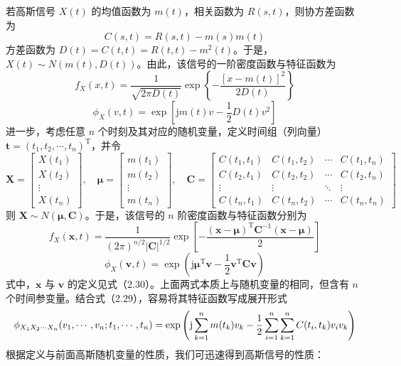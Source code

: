 \documentclass[11pt,openany,UTF8]{ctexbook}
\newcommand{\ju}{\mathrm{j}}                       %
\newcommand{\bX}{\bm{X}}
\newcommand{\bx}{\bm{x}}
\begin{document}
若高斯信号 $X(t)$ 的均值函数为 $m(t)$\nobreak，相关函数为 $R(s,t)$\nobreak，则协方差函数为
\[
C(s,t)=R(s,t)-m(s)m(t)
\]
方差函数为 $D(t)=C(t,t)=R(t,t)-m^2(t)$\nobreak。于是\nobreak，$X(t)\sim N(m(t),D(t))$\nobreak。由此\nobreak，该信号的一阶密度函数与特征函数为
\begin{equation}
f_X(x,t)=\frac{1}{\sqrt{2\pi D(t)}}\exp\left\{-\frac{[x-m(t)]^2}{2D(t)}\right\}
\label{eq:2.38}
\end{equation}
\begin{equation}
\phi_X(v,t)=\exp\left[\ju m(t)v-\frac{1}{2}D(t)v^2\right]
\label{eq:2.39}
\end{equation}
进一步\nobreak，考虑任意 $n$ 个时刻及其对应的随机变量\nobreak，定义时间组（列向量\nobreak）$\bm{t}=(t_1,t_2,\cdots,t_n)^{\mathrm{T}}$\nobreak，并令
\[
\bX=\begin{bmatrix}
X(t_1)\\ X(t_2)\\ \vdots\\ X(t_n)
\end{bmatrix},\quad
\bm{\mu}=\begin{bmatrix}
m(t_1)\\ m(t_2)\\ \vdots\\ m(t_n)
\end{bmatrix},\quad
\bm{C}=\begin{bmatrix}
C(t_1,t_1) & C(t_1,t_2) & \cdots & C(t_1,t_n)\\
C(t_2,t_1) & C(t_2,t_2) & \cdots & C(t_2,t_n)\\
\vdots & \vdots & \ddots & \vdots\\
C(t_n,t_1) & C(t_n,t_2) & \cdots & C(t_n,t_n)
\end{bmatrix}
\]
则 $\bX\sim N(\bm{\mu},\bm{C})$\nobreak。于是\nobreak，该信号的 $n$ 阶密度函数与特征函数分别为
\begin{equation}
f_X(\bx,t)=\frac{1}{(2\pi)^{n/2}\lvert\bm{C}\rvert^{1/2}}\exp\left[-\frac{(\bx-\bm{\mu})^{\mathrm{T}}\bm{C}^{-1}(\bx-\bm{\mu})}{2}\right]
\label{eq:2.40}
\end{equation}
\begin{equation}
\phi_X(\bm{v},t)=\exp\left(\ju\bm{\mu}^{\mathrm{T}}\bm{v}-\frac{1}{2}\bm{v}^{\mathrm{T}}\bm{C}\bm{v}\right)
\label{eq:2.41}
\end{equation}
式中\nobreak，$\bx$ 与 $\bm{v}$ 的定义见式（2.30\nobreak）\nobreak。上面两式本质上与随机变量的相同\nobreak，但含有 $n$ 个时间参变量\nobreak。结合式（2.29\nobreak）\nobreak，容易将其特征函数写成展开形式
\begin{equation}
\resizebox{\linewidth}{!}{$\displaystyle
\phi_{X_1X_2\cdots X_n}(v_1,\cdots,v_n;t_1,\cdots,t_n)=\exp\left(\ju\sum_{k=1}^{n}m(t_k)v_k-\frac{1}{2}\sum_{i=1}^{n}\sum_{k=1}^{n}C(t_i,t_k)v_iv_k\right)$}
\label{eq:2.42}
\end{equation}
根据定义与前面高斯随机变量的性质\nobreak，我们可迅速得到高斯信号的性质\nobreak：
\end{document}
